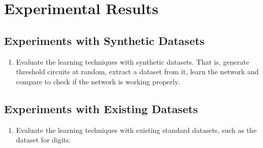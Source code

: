 \section{Experimental Results}



\subsection{Experiments with Synthetic Datasets}


\begin{enumerate}
    \item Evaluate the learning techniques with synthetic datasets. That is, generate threshold circuits at random, extract a dataset from it, learn the network and compare to check if the network is working properly. 
\end{enumerate}

\subsection{Experiments with Existing Datasets}

\begin{enumerate}
    \item Evaluate the learning techniques with existing standard datasets, such as the dataset for digits. 
\end{enumerate}

